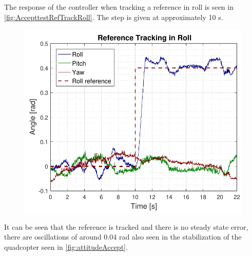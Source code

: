 The response of the controller when tracking a reference in roll is seen in \autoref{fig:AccepttestRefTrackRoll}. The step is given at approximately 10 s.
\begin{figure}[H]
	\includegraphics[scale=.7]{figures/AccepttestRefTrackRoll.pdf}
	\centering			
	\label{fig:AccepttestRefTrackRoll}
\end{figure}

It can be seen that the reference is tracked and there is no steady state error, there are oscillations of around 0.04 rad also seen in the stabilization of the quadcopter seen in \autoref{fig:attitudeAccept}.



